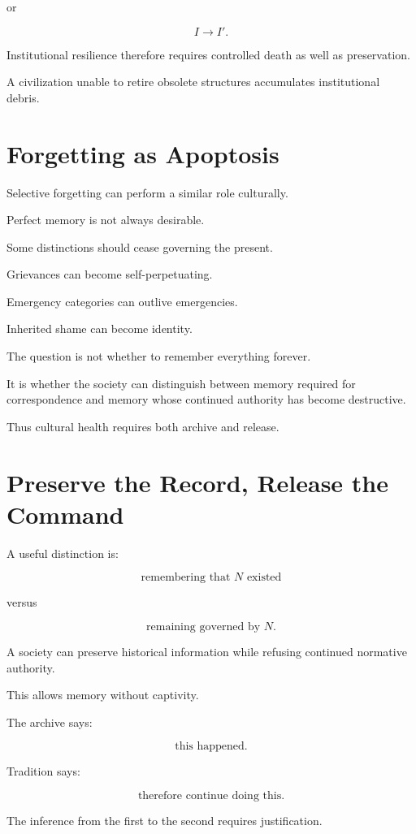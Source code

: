 \documentclass[11pt,oneside]{book}
\theoremstyle{definition}
\theoremstyle{remark}
\begin{document}
or

\[
I\rightarrow I'.
\]

Institutional resilience therefore requires controlled death as well as preservation.

A civilization unable to retire obsolete structures accumulates institutional debris.

\section{Forgetting as Apoptosis}

Selective forgetting can perform a similar role culturally.

Perfect memory is not always desirable.

Some distinctions should cease governing the present.

Grievances can become self-perpetuating.

Emergency categories can outlive emergencies.

Inherited shame can become identity.

The question is not whether to remember everything forever.

It is whether the society can distinguish between memory required for correspondence and memory whose continued authority has become destructive.

Thus cultural health requires both archive and release.

\section{Preserve the Record, Release the Command}

A useful distinction is:

\[
\text{remembering that }N\text{ existed}
\]

versus

\[
\text{remaining governed by }N.
\]

A society can preserve historical information while refusing continued normative authority.

This allows memory without captivity.

The archive says:

\[
\text{this happened}.
\]

Tradition says:

\[
\text{therefore continue doing this}.
\]

The inference from the first to the second requires justification.
\end{document}
